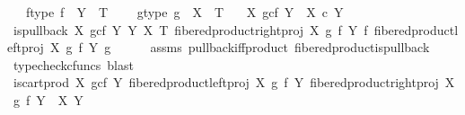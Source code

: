 \begin{isabellebody}
\ \ \ f{\isacharunderscore}{\kern0pt}type{\isacharcolon}{\kern0pt}\ {\isachardoublequoteopen}f\ {\isacharcolon}{\kern0pt}\ Y\ {\isasymrightarrow}\ T{\isachardoublequoteclose}\ \isanewline
\ \ \ g{\isacharunderscore}{\kern0pt}type{\isacharcolon}{\kern0pt}\ {\isachardoublequoteopen}g\ {\isacharcolon}{\kern0pt}\ X\ {\isasymrightarrow}\ T{\isachardoublequoteclose}\isanewline
\ \ \ {\isachardoublequoteopen}{\isacharparenleft}{\kern0pt}X\ \isactrlbsub g\isactrlesub {\isasymtimes}\isactrlsub c\isactrlbsub f\isactrlesub \ Y{\isacharparenright}{\kern0pt}\ {\isasymcong}\ X\ {\isasymtimes}\isactrlsub c\ Y{\isachardoublequoteclose}\isanewline
%
\isadelimproof
%
\endisadelimproof
%
\isatagproof
{}\isamarkupfalse%
\ {\isacharminus}{\kern0pt}\ \isanewline
\ \ \isamarkupfalse%
\ {\isachardoublequoteopen}{\isacharparenleft}{\kern0pt}is{\isacharunderscore}{\kern0pt}pullback\ {\isacharparenleft}{\kern0pt}X\ \isactrlbsub g\isactrlesub {\isasymtimes}\isactrlsub c\isactrlbsub f\isactrlesub \ Y{\isacharparenright}{\kern0pt}\ Y\ X\ T\ {\isacharparenleft}{\kern0pt}fibered{\isacharunderscore}{\kern0pt}product{\isacharunderscore}{\kern0pt}right{\isacharunderscore}{\kern0pt}proj\ X\ g\ f\ Y{\isacharparenright}{\kern0pt}\ f\ {\isacharparenleft}{\kern0pt}fibered{\isacharunderscore}{\kern0pt}product{\isacharunderscore}{\kern0pt}left{\isacharunderscore}{\kern0pt}proj\ X\ g\ f\ Y{\isacharparenright}{\kern0pt}\ g{\isacharparenright}{\kern0pt}{\isachardoublequoteclose}\isanewline
\ \ \ \ \isamarkupfalse%
\ assms\ pullback{\isacharunderscore}{\kern0pt}iff{\isacharunderscore}{\kern0pt}product\ fibered{\isacharunderscore}{\kern0pt}product{\isacharunderscore}{\kern0pt}is{\isacharunderscore}{\kern0pt}pullback\ \isamarkupfalse%
\ {\isacharparenleft}{\kern0pt}typecheck{\isacharunderscore}{\kern0pt}cfuncs{\isacharcomma}{\kern0pt}\ blast{\isacharparenright}{\kern0pt}\isanewline
\ \ \isamarkupfalse%
\ \isamarkupfalse%
\ {\isachardoublequoteopen}{\isacharparenleft}{\kern0pt}is{\isacharunderscore}{\kern0pt}cart{\isacharunderscore}{\kern0pt}prod\ {\isacharparenleft}{\kern0pt}X\ \isactrlbsub g\isactrlesub {\isasymtimes}\isactrlsub c\isactrlbsub f\isactrlesub \ Y{\isacharparenright}{\kern0pt}\ {\isacharparenleft}{\kern0pt}fibered{\isacharunderscore}{\kern0pt}product{\isacharunderscore}{\kern0pt}left{\isacharunderscore}{\kern0pt}proj\ X\ g\ f\ Y{\isacharparenright}{\kern0pt}\ {\isacharparenleft}{\kern0pt}fibered{\isacharunderscore}{\kern0pt}product{\isacharunderscore}{\kern0pt}right{\isacharunderscore}{\kern0pt}proj\ X\ g\ f\ Y{\isacharparenright}{\kern0pt}\ \ X\ Y{\isacharparenright}{\kern0pt}{\isachardoublequoteclose}\isanewline

\end{isabellebody}
